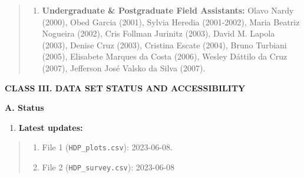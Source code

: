 \documentclass[
  man, donotrepeattitle,floatsintext]{apa6}
\providecommand{\tightlist}{%
  \setlength{\itemsep}{0pt}\setlength{\parskip}{0pt}}
\begin{document}
\begin{quote}
\begin{enumerate}
\def\labelenumi{\alph{enumi}.}
\setcounter{enumi}{2}
\tightlist
\item
  \textbf{Undergraduate \& Postgraduate Field Assistants:} Olavo Nardy (2000), Obed Garcia (2001), Sylvia Heredia (2001-2002), Maria Beatriz Nogueira (2002), Cris Follman Jurinitz (2003), David M. Lapola (2003), Denise Cruz (2003), Cristina Escate (2004), Bruno Turbiani (2005), Elisabete Marques da Costa (2006), Wesley Dáttilo da Cruz (2007), Jefferson José Valsko da Silva (2007).
\end{enumerate}
\end{quote}

\noindent  
\textbf{CLASS III. DATA SET STATUS AND ACCESSIBILITY}

\noindent  
\textbf{A. Status}

\begin{enumerate}
\def\labelenumi{\arabic{enumi}.}
\tightlist
\item
  \textbf{Latest updates:}
\end{enumerate}

\begin{quote}
\begin{enumerate}
\def\labelenumi{\alph{enumi}.}
\tightlist
\item
  File 1 (\texttt{HDP\_plots.csv}): 2023-06-08.
\item
  File 2 (\texttt{HDP\_survey.csv}): 2023-06-08
\end{enumerate}
\end{quote}
\end{document}
